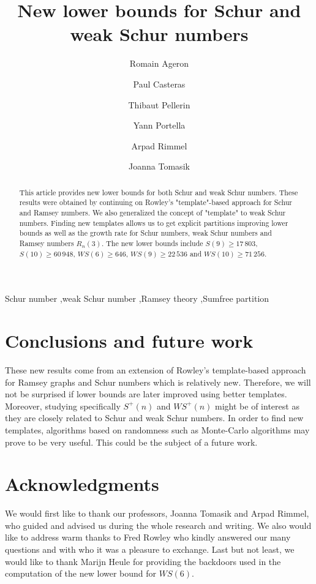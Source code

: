 \documentclass[3p]{elsarticle}
\title{New lower bounds for Schur and weak Schur numbers}
\author[1]{Romain Ageron\fnref{fn1}}
\author[1]{Paul Casteras\fnref{fn1}}
\author[1]{Thibaut Pellerin\fnref{fn1}}
\author[1]{Yann Portella\fnref{fn1}}
\author[2]{Arpad Rimmel\fnref{fn2}}
\author[2]{Joanna Tomasik\corref{cor1}\fnref{fn2}}
\newtheorem{computational theorem}[definition]{Computational Theorem}
\newcommand{\WS}{\mathit{WS}}
\begin{document}
\begin{abstract}

This article provides new lower bounds for both Schur and weak Schur numbers. These results were obtained by 
continuing on Rowley's "template"-based approach for Schur and Ramsey numbers. We also generalized the concept 
of "template" to weak Schur numbers. Finding new templates allows us to get explicit partitions improving lower bounds 
as well as the growth rate for Schur numbers, weak Schur numbers and Ramsey numbers \(R_n(3)\). The new lower 
bounds include \(S(9) \geqslant 17\,803\), \(S(10) \geqslant 60\,948\), \(\WS(6) \geqslant 646\), \(\WS (9) \geqslant 22\,536\) and 
\(\WS (10) \geqslant 71\,256 \).

\end{abstract}

\begin{keyword}
Schur number \sep weak Schur number \sep Ramsey theory \sep Sumfree partition
\end{keyword}

\maketitle







\section{Conclusions and future work}

\qquad These new results come from an extension of Rowley's template-based approach for Ramsey graphs and 
Schur numbers which is relatively new. Therefore, we will not be surprised if lower bounds are later improved 
using better templates. Moreover, studying specifically \(S^+(n)\) and \(\WS^+(n)\) might be of interest as they
 are closely related to Schur and weak Schur numbers. In order to find new templates, algorithms based on 
randomness such as Monte-Carlo algorithms may prove to be very useful. This could be the subject of a future work.

\section{Acknowledgments}

\qquad We would first like to thank our professors, Joanna Tomasik and Arpad Rimmel, who guided and advised
us during the whole research and writing. We also would like to address warm thanks
to Fred Rowley who kindly answered our many questions and with who it was a pleasure to exchange. 
Last but not least, we would like to thank Marijn Heule for providing the backdoors used in the computation of the 
new lower bound for \(\WS(6)\).






\end{document}
